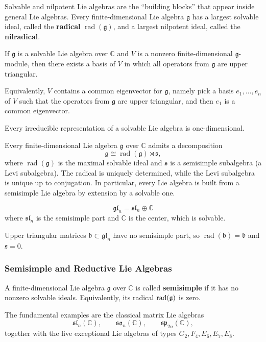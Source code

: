 \documentclass[12pt]{article}
\begin{document}
Solvable and nilpotent Lie algebras are the ``building blocks'' that appear inside general Lie algebras. Every finite-dimensional Lie algebra $\mathfrak g$ has a largest solvable ideal, called the \textbf{radical} $\operatorname{rad}(\mathfrak g)$, and a largest nilpotent ideal, called the \textbf{nilradical}.


\begin{theorem}
    If $\mathfrak g$ is a solvable Lie algebra over $\mathbb C$ and $V$ is a nonzero finite-dimensional $\mathfrak g$-module, then there exists a basis of $V$ in which all operators from $\mathfrak g$ are upper triangular.
\end{theorem} Equivalently, $V$ contains a common eigenvector for $\mathfrak g$, namely pick a basis $e_1,\dots,e_n$ of $V$ such that the operators from $\mathfrak g$ are upper triangular, and then $e_1$ is a common eigenvector.

\begin{corollary}
    Every irreducible representation of a solvable Lie algebra is one-dimensional.
\end{corollary}



Every finite-dimensional Lie algebra $\mathfrak g$ over $\mathbb{C}$ admits a decomposition
\[
    \mathfrak g \cong \operatorname{rad}(\mathfrak g) \rtimes \mathfrak s,
\]
where $\operatorname{rad}(\mathfrak g)$ is the maximal solvable ideal and $\mathfrak s$ is a semisimple subalgebra (a Levi subalgebra). The radical is uniquely determined, while the Levi subalgebra is unique up to conjugation. In particular, every Lie algebra is built from a semisimple Lie algebra by extension by a solvable one.
\begin{example}
    \[
        \mathfrak{gl}_n = \mathfrak{sl}_n \oplus \mathbb{C}
    \]
    where $\mathfrak{sl}_n$ is the semisimple part and $\mathbb{C}$ is the center, which is solvable.
\end{example}

\begin{example}
    Upper triangular matrices $\mathfrak{b} \subset \mathfrak{gl}_n$ have no semisimple part, so $\operatorname{rad}(\mathfrak{b}) = \mathfrak{b}$ and $\mathfrak s = 0$.
\end{example}

\subsubsection{Semisimple and Reductive Lie Algebras}
\begin{definition}
    A finite-dimensional Lie algebra $\mathfrak g$ over $\mathbb C$ is called \textbf{semisimple} if it has no nonzero solvable ideals. Equivalently, its radical $\operatorname{rad}(\mathfrak g)$ is zero.
\end{definition}
The fundamental examples are the classical matrix Lie algebras
\[
    \mathfrak{sl}_n(\mathbb C),\qquad
    \mathfrak{so}_n(\mathbb C),\qquad
    \mathfrak{sp}_{2n}(\mathbb C),
\]
together with the five exceptional Lie algebras of types $G_2,F_4,E_6,E_7,E_8$.
\end{document}
